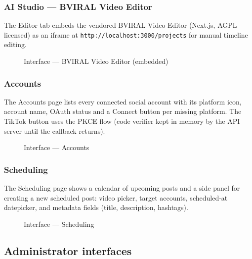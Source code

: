 \subsubsection{AI Studio --- BVIRAL Video Editor}
\label{sec:ui_editor}
The Editor tab embeds the vendored BVIRAL Video Editor (Next.js, AGPL-licensed) as an
iframe at \texttt{http://localhost:3000/projects} for manual timeline editing.

\begin{figure}[H]
  \centering
  \caption{Interface --- BVIRAL Video Editor (embedded)}
  \label{fig:ui_editor}
\end{figure}

\subsubsection{Accounts}
\label{sec:ui_accounts}
The Accounts page lists every connected social account with its platform icon, account
name, OAuth status and a Connect button per missing platform. The TikTok button uses the
PKCE flow (code verifier kept in memory by the API server until the callback returns).

\begin{figure}[H]
  \centering
  \caption{Interface --- Accounts}
  \label{fig:ui_accounts}
\end{figure}

\subsubsection{Scheduling}
\label{sec:ui_scheduling}
The Scheduling page shows a calendar of upcoming posts and a side panel for creating a new
scheduled post: video picker, target accounts, scheduled-at datepicker, and metadata
fields (title, description, hashtags).

\begin{figure}[H]
  \centering
  \caption{Interface --- Scheduling}
  \label{fig:ui_scheduling}
\end{figure}

\subsection{Administrator interfaces}
\label{sec:admin_ui}

